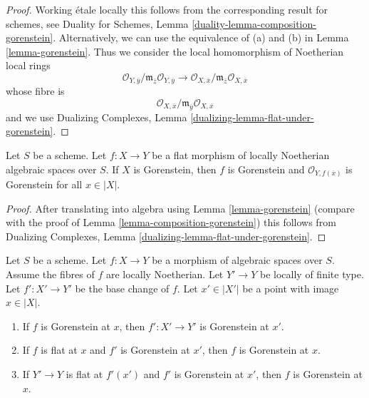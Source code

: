 \begin{proof}
Working \'etale locally this follows from the corresponding result for
schemes, see Duality for Schemes, Lemma
\ref{duality-lemma-composition-gorenstein}.
Alternatively, we can use the equivalence of (a) and (b) in
Lemma \ref{lemma-gorenstein}. Thus we consider the local homomorphism
of Noetherian local rings
$$
\mathcal{O}_{Y, \overline{y}}/
\mathfrak m_{\overline{z}}\mathcal{O}_{Y, \overline{y}}
\longrightarrow
\mathcal{O}_{X, \overline{x}}/
\mathfrak m_{\overline{z}}\mathcal{O}_{X, \overline{x}}
$$
whose fibre is
$$
\mathcal{O}_{X, \overline{x}}/
\mathfrak m_{\overline{y}}\mathcal{O}_{X, \overline{x}}
$$
and we use Dualizing Complexes, Lemma
\ref{dualizing-lemma-flat-under-gorenstein}.
\end{proof}

\begin{lemma}
\label{lemma-flat-morphism-from-gorenstein}
Let $S$ be a scheme.
Let $f : X \to Y$ be a flat morphism of locally Noetherian
algebraic spaces over $S$.
If $X$ is Gorenstein, then $f$ is Gorenstein and
$\mathcal{O}_{Y, f(\overline{x})}$ is Gorenstein for all $x \in |X|$.
\end{lemma}

\begin{proof}
After translating into algebra using Lemma \ref{lemma-gorenstein}
(compare with the proof of
Lemma \ref{lemma-composition-gorenstein}) this follows from
Dualizing Complexes, Lemma \ref{dualizing-lemma-flat-under-gorenstein}.
\end{proof}

\begin{lemma}
\label{lemma-base-change-gorenstein}
Let $S$ be a scheme.
Let $f : X \to Y$ be a morphism of algebraic spaces over $S$.
Assume the fibres of $f$ are locally Noetherian.
Let $Y' \to Y$ be locally of finite type. Let $f' : X' \to Y'$
be the base change of $f$.
Let $x' \in |X'|$ be a point with image $x \in |X|$.
\begin{enumerate}
\item If $f$ is Gorenstein at $x$, then
$f' : X' \to Y'$ is Gorenstein at $x'$.
\item If $f$ is flat at $x$ and $f'$ is Gorenstein at $x'$, then $f$
is Gorenstein at $x$.
\item If $Y' \to Y$ is flat at $f'(x')$ and $f'$ is Gorenstein at
$x'$, then $f$ is Gorenstein at $x$.
\end{enumerate}
\end{lemma}

